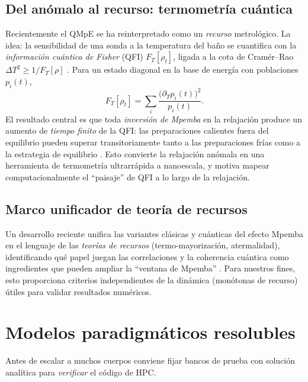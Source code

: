 \documentclass[11pt,a4paper]{article}
\theoremstyle{definition}
\theoremstyle{plain}
\begin{document}
\subsection{Del anómalo al recurso: termometría cuántica}

Recientemente el QMpE se ha reinterpretado como un \emph{recurso} metrológico. La idea: la sensibilidad de
una sonda a la temperatura del baño se cuantifica con la \emph{información cuántica de Fisher} (QFI)
$F_T[\rho_t]$, ligada a la cota de Cramér--Rao $\Delta T^2 \ge 1/F_T[\rho]$ \cite{Chattopadhyay2026,LiYang2026}.
Para un estado diagonal en la base de energía con poblaciones $p_i(t)$,
\begin{equation}
F_T[\rho_t]=\sum_i \frac{\big(\partial_T p_i(t)\big)^2}{p_i(t)} .
\label{eq:qfi}
\end{equation}
El resultado central es que toda \emph{inversión de Mpemba} en la relajación produce un aumento de
\emph{tiempo finito} de la QFI: las preparaciones calientes fuera del equilibrio pueden superar
transitoriamente tanto a las preparaciones frías como a la estrategia de equilibrio
\cite{Chattopadhyay2026,LiYang2026}. Esto convierte la relajación anómala en una herramienta de termometría
ultrarrápida a nanoescala, y motiva mapear computacionalmente el ``paisaje'' de QFI a lo largo de la
relajación.

\subsection{Marco unificador de teoría de recursos}

Un desarrollo reciente unifica las variantes clásicas y cuánticas del efecto Mpemba en el lenguaje de las
\emph{teorías de recursos} (termo-mayorización, atermalidad), identificando qué papel juegan las
correlaciones y la coherencia cuántica como ingredientes que pueden ampliar la ``ventana de Mpemba''
\cite{Alyuruk2025,Summer2026}. Para nuestros fines, esto proporciona criterios independientes de la dinámica
(monótonas de recurso) útiles para validar resultados numéricos.

\section{Modelos paradigmáticos resolubles}

Antes de escalar a muchos cuerpos conviene fijar bancos de prueba con solución analítica para
\emph{verificar} el código de HPC.
\end{document}
